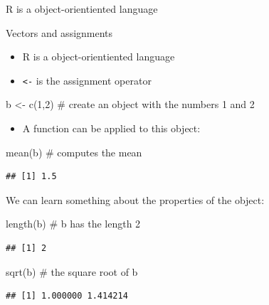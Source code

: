 \documentclass[
  10pt,
  ignorenonframetext,
]{beamer}
\newenvironment{Shaded}{\begin{snugshade}}{\end{snugshade}}
\newcommand{\CommentTok}[1]{\textcolor[rgb]{0.50,0.62,0.50}{#1}}
\newcommand{\DecValTok}[1]{\textcolor[rgb]{0.86,0.86,0.80}{#1}}
\newcommand{\KeywordTok}[1]{\textcolor[rgb]{0.94,0.87,0.69}{#1}}
\newcommand{\NormalTok}[1]{\textcolor[rgb]{0.80,0.80,0.80}{#1}}
\newcommand{\StringTok}[1]{\textcolor[rgb]{0.80,0.58,0.58}{#1}}
\providecommand{\tightlist}{%
  \setlength{\itemsep}{0pt}\setlength{\parskip}{0pt}}
\begin{document}
\begin{frame}[fragile]{R is a object-orientiented language}
\protect\hypertarget{r-is-a-object-orientiented-language}{}

\begin{block}{Vectors and assignments}

\begin{itemize}
\tightlist
\item
  R is a object-orientiented language
\item
  \texttt{\textless{}-} is the assignment operator
\end{itemize}

\begin{Shaded}
\begin{Highlighting}[]
\NormalTok{b <-}\StringTok{ }\KeywordTok{c}\NormalTok{(}\DecValTok{1}\NormalTok{,}\DecValTok{2}\NormalTok{) }\CommentTok{# create an object with the numbers 1 and 2}
\end{Highlighting}
\end{Shaded}

\begin{itemize}
\tightlist
\item
  A function can be applied to this object:
\end{itemize}

\begin{Shaded}
\begin{Highlighting}[]
\KeywordTok{mean}\NormalTok{(b) }\CommentTok{# computes the mean}
\end{Highlighting}
\end{Shaded}

\begin{verbatim}
## [1] 1.5
\end{verbatim}

We can learn something about the properties of the object:

\begin{Shaded}
\begin{Highlighting}[]
\KeywordTok{length}\NormalTok{(b) }\CommentTok{# b has the length 2}
\end{Highlighting}
\end{Shaded}

\begin{verbatim}
## [1] 2
\end{verbatim}

\begin{Shaded}
\begin{Highlighting}[]
\KeywordTok{sqrt}\NormalTok{(b) }\CommentTok{# the square root of b}
\end{Highlighting}
\end{Shaded}

\begin{verbatim}
## [1] 1.000000 1.414214
\end{verbatim}

\end{block}

\end{frame}
\end{document}
